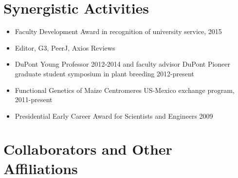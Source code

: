 \section{Synergistic Activities}

\begin{itemize} \setlength{\itemsep}{0pt} \setlength{\parskip}{2pt} \setlength{\parsep}{0pt}
\item Faculty Development Award in recognition of university service, 2015
\item Editor, G3, PeerJ, Axios Reviews
\item DuPont Young Professor 2012-2014 and faculty advisor DuPont Pioneer graduate student symposium in plant breeding 2012-present


\item Functional Genetics of Maize Centromeres US-Mexico exchange program, 2011-present

\item Presidential Early Career Award for Scientists and Engineers 2009

\end{itemize}

\section{Collaborators and Other Affiliations}


